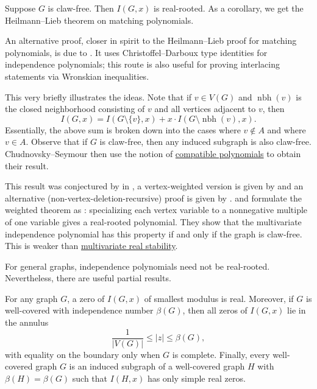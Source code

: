 \begin{theorem}
Suppose $G$ is claw-free. Then $I(G,x)$ is real-rooted.
As a corollary, we get the Heilmann--Lieb theorem on matching polynomials.
\end{theorem}

An alternative proof, closer in spirit to the Heilmann--Lieb proof for
matching polynomials, is due to  \cite{Bencs2014}.
It uses Christoffel--Darboux type identities for independence polynomials;
this route is also useful for proving interlacing statements via Wronskian
inequalities.

\begin{proof*}
This very briefly illustrates the ideas. Note that if $v \in V(G)$ and
$\operatorname{nbh}(v)$ is the closed neighborhood consisting of $v$ and all
vertices adjacent to $v$, then
\[
 I(G,x) = I(G \setminus \{v\} ,x)
 + x \cdot I(G \setminus \operatorname{nbh}(v),x).
\]
Essentially, the above sum is broken down into the cases where $v \notin A$
and where $v \in A$.
Observe that if $G$ is claw-free, then any induced subgraph is also claw-free.
Chudnovsky--Seymour then use the notion of \hyperref[compatiblePolynomials]{compatible polynomials}
to obtain their result.
\end{proof*}

This result was conjectured by  in \cite{Stanley1998},
a vertex-weighted version is given by  \cite{Engstrom2007}
and an alternative (non-vertex-deletion-recursive)
proof is given by  \cite{Lass2012}.
 and 
\cite[Thm.~3.5 and Cor.~3.6]{LeakeRyder2019} formulate the weighted theorem as
: specializing each vertex variable to a
nonnegative multiple of one variable gives a real-rooted polynomial.
They show that the multivariate independence polynomial has this property
if and only if the graph is claw-free. This is weaker than
\hyperref[stablePolynomial]{multivariate real stability}.

For general graphs, independence polynomials need not be real-rooted.
Nevertheless, there are useful partial results.

\begin{theorem}
For any graph $G$, a zero of $I(G,x)$ of smallest modulus is real.
Moreover, if $G$ is well-covered with independence number $\beta(G)$,
then all zeros of $I(G,x)$ lie in the annulus
\[
  \frac{1}{|V(G)|}\leq |z|\leq \beta(G),
\]
with equality on the boundary only when $G$ is complete.
Finally, every well-covered graph $G$ is an induced subgraph of a
well-covered graph $H$ with $\beta(H)=\beta(G)$ such that $I(H,x)$ has
only simple real zeros.
\end{theorem}

